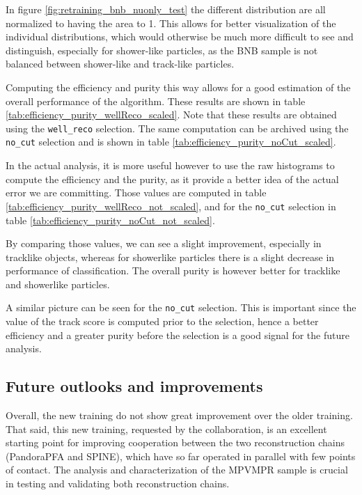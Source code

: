 In figure \ref{fig:retraining_bnb_nuonly_test} the different distribution are all normalized to having the area to 1. This allows for better visualization of the individual distributions, which would otherwise be much more difficult to see and distinguish, especially for shower-like particles, as the BNB sample is not balanced between shower-like and track-like particles. 



Computing the efficiency and purity this way allows for a good estimation of the overall performance of the algorithm. These results are shown in table \ref{tab:efficiency_purity_wellReco_scaled}. Note that these results are obtained using the \texttt{well\_reco} selection. The same computation can be archived using the \texttt{no\_cut} selection and is shown in table \ref{tab:efficiency_purity_noCut_scaled}. 

In the actual analysis, it is more useful however to use the raw histograms to compute the efficiency and the purity, as it provide a better idea of the actual error we are committing. Those values are computed in table \ref{tab:efficiency_purity_wellReco_not_scaled}, and for the \texttt{no\_cut} selection in table \ref{tab:efficiency_purity_noCut_not_scaled}. 

By comparing those values, we can see a slight improvement, especially in tracklike objects, whereas for showerlike particles there is a slight decrease in performance of classification. The overall purity is however better for tracklike and showerlike particles. 

A similar picture can be seen for the \texttt{no\_cut} selection. This is important since the value of the track score is computed prior to the selection, hence a better efficiency and a greater purity before the selection is a good signal for the future analysis. 

\subsection{Future outlooks and improvements}

Overall, the new training do not show great improvement over the older training. That said, this new training, requested by the collaboration, is an excellent starting point for improving cooperation between the two reconstruction chains (PandoraPFA and SPINE), which have so far operated in parallel with few points of contact. The analysis and characterization of the MPVMPR sample is crucial in testing and validating both reconstruction chains. 

